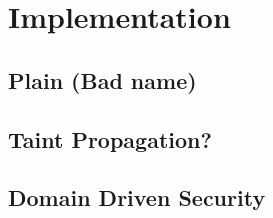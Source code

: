 \chapter{Implementation}


\section{Plain (Bad name)}

\section{Taint Propagation?}

\section{Domain Driven Security}